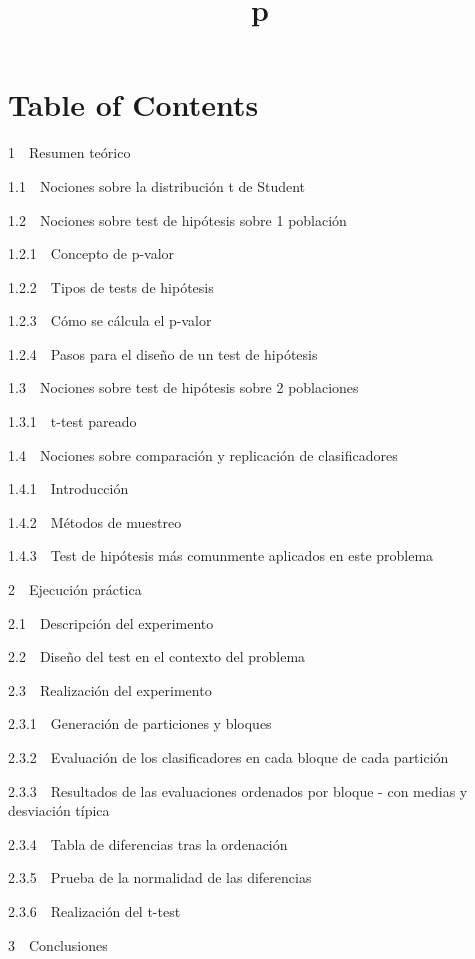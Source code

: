 \documentclass[11pt]{article}
\title{p}
\begin{document}
    
    
    \maketitle
    
    

    
    \section{Table of Contents}\label{table-of-contents}

{1~~}Resumen teórico

{1.1~~}Nociones sobre la distribución t de Student

{1.2~~}Nociones sobre test de hipótesis sobre 1 población

{1.2.1~~}Concepto de p-valor

{1.2.2~~}Tipos de tests de hipótesis

{1.2.3~~}Cómo se cálcula el p-valor

{1.2.4~~}Pasos para el diseño de un test de hipótesis

{1.3~~}Nociones sobre test de hipótesis sobre 2 poblaciones

{1.3.1~~}t-test pareado

{1.4~~}Nociones sobre comparación y replicación de clasificadores

{1.4.1~~}Introducción

{1.4.2~~}Métodos de muestreo

{1.4.3~~}Test de hipótesis más comunmente aplicados en este problema

{2~~}Ejecución práctica

{2.1~~}Descripción del experimento

{2.2~~}Diseño del test en el contexto del problema

{2.3~~}Realización del experimento

{2.3.1~~}Generación de particiones y bloques

{2.3.2~~}Evaluación de los clasificadores en cada bloque de cada
partición

{2.3.3~~}Resultados de las evaluaciones ordenados por bloque - con
medias y desviación típica

{2.3.4~~}Tabla de diferencias tras la ordenación

{2.3.5~~}Prueba de la normalidad de las diferencias

{2.3.6~~}Realización del t-test

{3~~}Conclusiones
\end{document}
